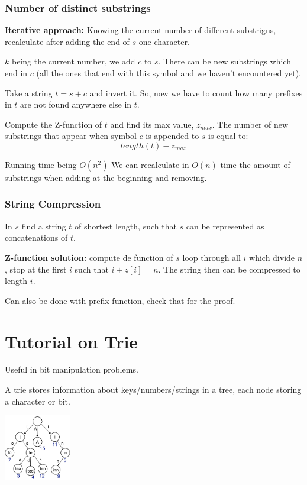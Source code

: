 \documentclass{IEEEtran}
\begin{document}
      \subsubsection{Number of distinct substrings}
        \textbf{Iterative approach:} Knowing the current number of different substrigns, recalculate after adding the end of $s$ one character.\par 
        $k$ being the current number, we add $c$ to $s$. There can be new substrings which end in $c$ (all the ones that end with this symbol and we haven't encountered yet).\par 
        Take a string $t=s+c$ and invert it. So, now we have to count how many prefixes in $t$ are not found anywhere else in $t$.\par 
        Compute the Z-function of $t$ and find its max value, $z_{max}$. The number of new substrings that appear when symbol $c$ is appended to $s$ is equal to:
        $$length(t)-z_{max}$$
        \par Running time being $O(n^2)$
        We can recalculate in $O(n)$ time the amount of substrings when adding at the beginning and removing.
      \subsubsection{String Compression}
        In $s$ find a string $t$ of shortest length, such that $s$ can be represented as concatenations of $t$.\par 
        \textbf{Z-function solution:} compute de function of $s$ loop through all $i$ which divide $n$, stop at the first $i$ such that $i+z[i]=n$. The string then can be compressed to length $i$.\par 
        Can also be done with prefix function, check that for the proof. 
  \section{Tutorial on Trie}
    Useful in bit manipulation problems.\par 
    A trie stores information about keys/numbers/strings in a tree, each node storing a character or bit.
    \begin{center}
      \includegraphics[width=0.22\textwidth]{stringTrie.png}
    \end{center}
\end{document}

